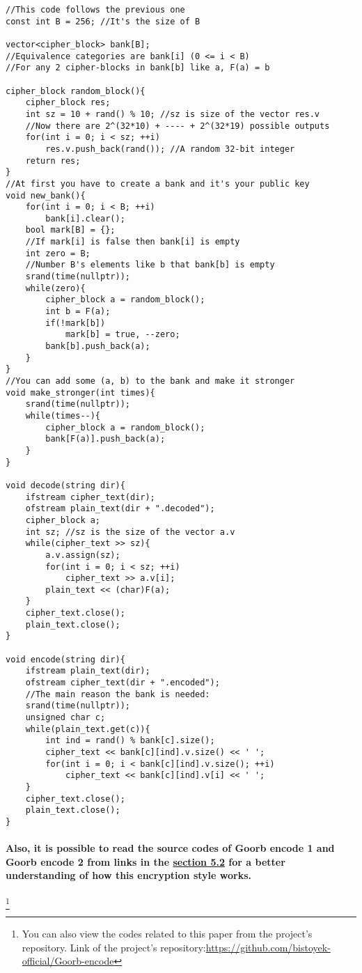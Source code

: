 \documentclass[oneside]{book}
\newcommand{\myparagraph}[1]{\paragraph{\textnormal{#1}}}
\begin{document}
\begin{lstlisting}
//This code follows the previous one
const int B = 256; //It's the size of B

vector<cipher_block> bank[B];
//Equivalence categories are bank[i] (0 <= i < B)
//For any 2 cipher-blocks in bank[b] like a, F(a) = b

cipher_block random_block(){
    cipher_block res;
    int sz = 10 + rand() % 10; //sz is size of the vector res.v
    //Now there are 2^(32*10) + ---- + 2^(32*19) possible outputs
    for(int i = 0; i < sz; ++i)
        res.v.push_back(rand()); //A random 32-bit integer
    return res;
}
//At first you have to create a bank and it's your public key
void new_bank(){
    for(int i = 0; i < B; ++i)
        bank[i].clear();
    bool mark[B] = {};
    //If mark[i] is false then bank[i] is empty 
    int zero = B;
    //Number B's elements like b that bank[b] is empty
    srand(time(nullptr));
    while(zero){
        cipher_block a = random_block();
        int b = F(a);
        if(!mark[b])
            mark[b] = true, --zero;
        bank[b].push_back(a);
    }
}
//You can add some (a, b) to the bank and make it stronger
void make_stronger(int times){
    srand(time(nullptr));
    while(times--){
        cipher_block a = random_block();
        bank[F(a)].push_back(a);
    }
}

void decode(string dir){
    ifstream cipher_text(dir);
    ofstream plain_text(dir + ".decoded");
    cipher_block a;
    int sz; //sz is the size of the vector a.v
    while(cipher_text >> sz){
        a.v.assign(sz);
        for(int i = 0; i < sz; ++i)
            cipher_text >> a.v[i];
        plain_text << (char)F(a);
    }
    cipher_text.close();
    plain_text.close();
}

void encode(string dir){
    ifstream plain_text(dir);
    ofstream cipher_text(dir + ".encoded");
    //The main reason the bank is needed:
    srand(time(nullptr));
    unsigned char c;
    while(plain_text.get(c)){
        int ind = rand() % bank[c].size();
        cipher_text << bank[c][ind].v.size() << ' ';
        for(int i = 0; i < bank[c][ind].v.size(); ++i)
            cipher_text << bank[c][ind].v[i] << ' ';
    }
    cipher_text.close();
    plain_text.close();
}
\end{lstlisting}

\myparagraph{
Also, it is possible to read the source codes of \textbf{Goorb encode 1} and \textbf{Goorb encode 2} from links in the \hyperref[subsec:codes]{\textbf{section 5.2}} for a better understanding of how this encryption style works.
}
\footnote{You can also view the codes related to this paper from the project's repository.\newline
Link of the project's repository:\newline \href{https://github.com/bistoyek-official/Goorb-encode}{https://github.com/bistoyek-official/Goorb-encode}}
\end{document}
